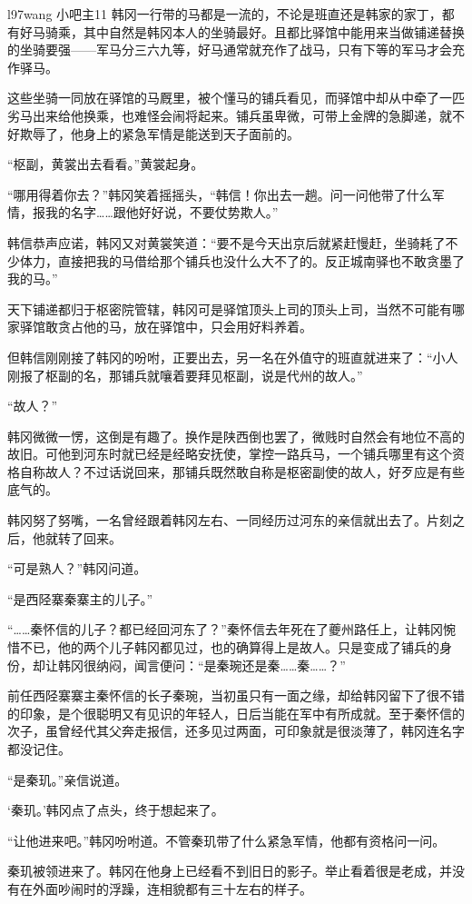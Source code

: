 l97wang
小吧主11
韩冈一行带的马都是一流的，不论是班直还是韩家的家丁，都有好马骑乘，其中自然是韩冈本人的坐骑最好。且都比驿馆中能用来当做铺递替换的坐骑要强——军马分三六九等，好马通常就充作了战马，只有下等的军马才会充作驿马。 

这些坐骑一同放在驿馆的马厩里，被个懂马的铺兵看见，而驿馆中却从中牵了一匹劣马出来给他换乘，也难怪会闹将起来。铺兵虽卑微，可带上金牌的急脚递，就不好欺辱了，他身上的紧急军情是能送到天子面前的。 

“枢副，黄裳出去看看。”黄裳起身。 

“哪用得着你去？”韩冈笑着摇摇头，“韩信！你出去一趟。问一问他带了什么军情，报我的名字……跟他好好说，不要仗势欺人。” 

韩信恭声应诺，韩冈又对黄裳笑道：“要不是今天出京后就紧赶慢赶，坐骑耗了不少体力，直接把我的马借给那个铺兵也没什么大不了的。反正城南驿也不敢贪墨了我的马。” 

天下铺递都归于枢密院管辖，韩冈可是驿馆顶头上司的顶头上司，当然不可能有哪家驿馆敢贪占他的马，放在驿馆中，只会用好料养着。 

但韩信刚刚接了韩冈的吩咐，正要出去，另一名在外值守的班直就进来了：“小人刚报了枢副的名，那铺兵就嚷着要拜见枢副，说是代州的故人。” 

“故人？” 

韩冈微微一愣，这倒是有趣了。换作是陕西倒也罢了，微贱时自然会有地位不高的故旧。可他到河东时就已经是经略安抚使，掌控一路兵马，一个铺兵哪里有这个资格自称故人？不过话说回来，那铺兵既然敢自称是枢密副使的故人，好歹应是有些底气的。 

韩冈努了努嘴，一名曾经跟着韩冈左右、一同经历过河东的亲信就出去了。片刻之后，他就转了回来。 

“可是熟人？”韩冈问道。 

“是西陉寨秦寨主的儿子。” 

“……秦怀信的儿子？都已经回河东了？”秦怀信去年死在了夔州路任上，让韩冈惋惜不已，他的两个儿子韩冈都见过，也的确算得上是故人。只是变成了铺兵的身份，却让韩冈很纳闷，闻言便问：“是秦琬还是秦……秦……？” 

前任西陉寨寨主秦怀信的长子秦琬，当初虽只有一面之缘，却给韩冈留下了很不错的印象，是个很聪明又有见识的年轻人，日后当能在军中有所成就。至于秦怀信的次子，虽曾经代其父奔走报信，还多见过两面，可印象就是很淡薄了，韩冈连名字都没记住。 

“是秦玑。”亲信说道。 

‘秦玑。’韩冈点了点头，终于想起来了。 

“让他进来吧。”韩冈吩咐道。不管秦玑带了什么紧急军情，他都有资格问一问。

秦玑被领进来了。韩冈在他身上已经看不到旧日的影子。举止看着很是老成，并没有在外面吵闹时的浮躁，连相貌都有三十左右的样子。 

